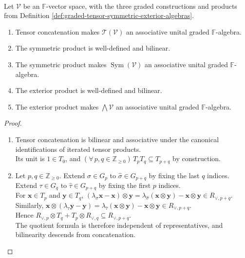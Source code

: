\begin{proposition} \label{prop:graded-tensor-symmetric-exterior-algebra-laws} \\
Let $\mathcal{V}$ be an $\mathbb{F}$-vector space, with the three graded constructions and products from Definition \ref{def:graded-tensor-symmetric-exterior-algebras}.
\begin{enumerate}[label=(\roman*)]
\setlength{\itemsep}{0pt}
\item Tensor concatenation makes $\mathcal{T}(\mathcal{V})$ an associative unital graded $\mathbb{F}$-algebra.
\item The symmetric product is well-defined and bilinear.
\item The symmetric product makes $\operatorname{Sym}(\mathcal{V})$ an associative unital graded $\mathbb{F}$-algebra.
\item The exterior product is well-defined and bilinear.
\item The exterior product makes $\bigwedge\mathcal{V}$ an associative unital graded $\mathbb{F}$-algebra.
\end{enumerate}
\begin{proof}
\begin{enumerate}[label=(\roman*)]
\setlength{\itemsep}{0pt}
\item Tensor concatenation is bilinear and associative under the canonical identifications of iterated tensor products.\\
Its unit is $1\in T_0$, and $(\forall\,p,q\in\mathbb{Z}_{\geq0})\,T_pT_q\subseteq T_{p+q}$ by construction.
\item Let $p,q\in\mathbb{Z}_{\geq0}$. Extend $\sigma\in G_p$ to $\widehat{\sigma}\in G_{p+q}$ by fixing the last $q$ indices.\\
Extend $\tau\in G_q$ to $\widehat{\tau}\in G_{p+q}$ by fixing the first $p$ indices.\\
For $\mathbf{x}\in T_p$ and $\mathbf{y}\in T_q$, $(\lambda_{\sigma}\mathbf{x}-\mathbf{x})\otimes\mathbf{y}=\lambda_{\widehat{\sigma}}(\mathbf{x}\otimes\mathbf{y})-\mathbf{x}\otimes\mathbf{y}\in R_{\vee,p+q}$.\\
Similarly, $\mathbf{x}\otimes(\lambda_{\tau}\mathbf{y}-\mathbf{y})=\lambda_{\widehat{\tau}}(\mathbf{x}\otimes\mathbf{y})-\mathbf{x}\otimes\mathbf{y}\in R_{\vee,p+q}$.\\
Hence $R_{\vee,p}\otimes T_q+T_p\otimes R_{\vee,q}\subseteq R_{\vee,p+q}$.\\
The quotient formula is therefore independent of representatives, and bilinearity descends from concatenation.

\end{enumerate}
\end{proof}
\end{proposition}
